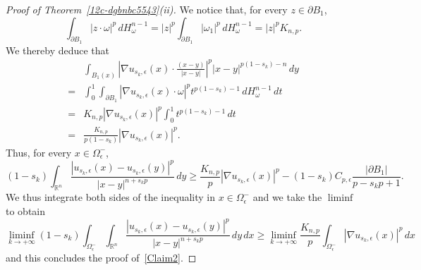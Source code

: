 \documentclass[12pt]{article}
\newcommand{\R}{\mathbb{R}}
\numberwithin{equation}{section}
\renewcommand{\geq}{\geqslant}
\begin{document}
\begin{proof}[Proof of Theorem~\ref{12c-dgbnbc5543}(ii)]
We notice that, for every $z \in\partial B_1$,
\begin{equation*}
\int_{\partial B_1}\left|z\cdot \omega\right|^p\,dH_\omega^{n-1}= \left|z\right|^p\int_{\partial B_1}\left|\omega_1\right|^p\,dH_{\omega}^{n-1}=\left|z\right|^p K_{n,p}. 
\end{equation*}
We thereby deduce that 
\begin{equation*}
\begin{split}
&\int_{B_1(x)}\left|\nabla u_{s_k,\epsilon} (x) \cdot\frac{(x-y)}{\left|x-y\right|}\right|^p\left|x-y\right|^{p(1-s_k)-n}\,dy\\
=&\int_{0}^1\int_{\partial B_1} \left|\nabla u_{s_k,\epsilon} (x) \cdot \omega \right|^p t^{p(1-s_k)-1}\,dH_{\omega}^{n-1}\,dt\\
=&K_{n,p}\left|\nabla u_{s_k,\epsilon}(x)\right|^p\int_{0}^1 t^{p(1-s_k)-1}\,dt\\
=&\frac{K_{n,p}}{p(1-s_k)}\left|\nabla u_{s_k,\epsilon}(x)\right|^p.
\end{split}
\end{equation*}
Thus, for every $x\in \Omega_{\epsilon}^{-}$,
\begin{equation*}
(1-s_k)\int_{\R^n} \frac{\left|u_{s_k,\epsilon}(x)-u_{s_k,\epsilon}(y)\right|^p}{\left|x-y\right|^{n+s_k p}}\,dy\geq \frac{K_{n,p}}{p}\left|\nabla u_{s_k,\epsilon}(x)\right|^p-(1-s_k)C_{p,\epsilon}\frac{\left|\partial B_1\right|}{p-s_k p+1}.
\end{equation*}
We thus integrate both sides of the inequality in $x\in\Omega_{\epsilon}^-$ and we take the $\liminf$  to obtain 
\begin{equation*}
\liminf_{k\to +\infty} (1-s_k)\int_{\Omega_{\epsilon}^{-}} \int_{\R^n}\frac{\left|u_{s_k,\epsilon}(x)-u_{s_k,\epsilon}(y)\right|^p}{\left|x-y\right|^{n+s_kp}}\,dy\,dx\geq \liminf_{k\to +\infty}\frac{K_{n,p}}{p}\int_{\Omega_{\epsilon}^{-}} \left|\nabla u_{s_k,\epsilon}(x)\right|^p\,dx
\end{equation*}
and this concludes the proof of~\eqref{Claim2}.\qedhere 
\end{proof}
\end{document}
